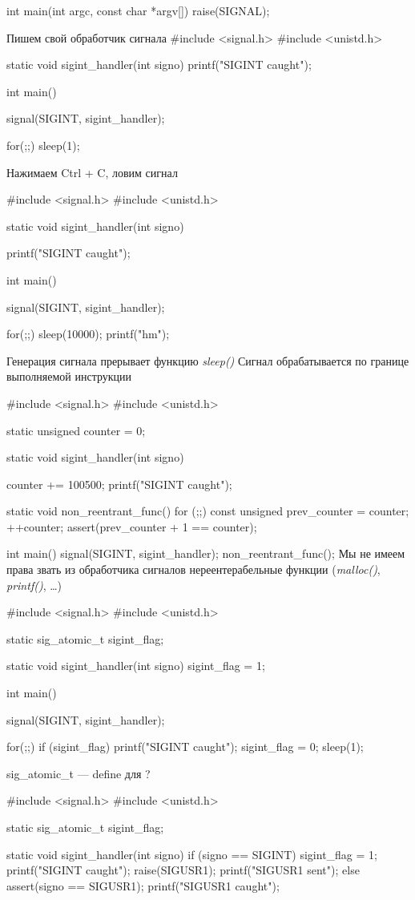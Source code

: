 int main(int argc, const char *argv[]) {
    raise(SIGNAL);
}

Пишем свой обработчик сигнала
#include <signal.h>
#include <unistd.h>

static void sigint_handler(int signo) {
    printf("SIGINT caught\n");
}

int main() {
    signal(SIGINT, sigint_handler);

    for(;;) {
        sleep(1);
    }
}
Нажимаем Ctrl + C, ловим сигнал

#include <signal.h>
#include <unistd.h>

static void sigint_handler(int signo) {
    printf("SIGINT caught\n");

}

int main() {
    signal(SIGINT, sigint_handler);

    for(;;) {
        sleep(10000);
        printf("hm\n");
    }
}
Генерация сигнала прерывает функцию \emph{sleep()}
Сигнал обрабатывается по границе выполняемой инструкции

#include <signal.h>
#include <unistd.h>

static unsigned counter = 0;

static void sigint_handler(int signo) {
    counter += 100500;
    printf("SIGINT caught\n");

}

static void non_reentrant_func() {
    for (;;) {
        const unsigned prev_counter = counter;
        ++counter;
        assert(prev_counter + 1 == counter);
    }
}

int main() {
    signal(SIGINT, sigint_handler);
    non_reentrant_func();
}
Мы не имеем права звать из обработчика сигналов нереентерабельные функции (\emph{malloc()}, \emph{printf()}, \dots)

#include <signal.h>
#include <unistd.h>

static sig_atomic_t sigint_flag;

static void sigint_handler(int signo) {
    sigint_flag = 1;
}

int main() {
    signal(SIGINT, sigint_handler);

    for(;;) {
        if (sigint_flag) {
            printf("SIGINT caught\n");
            sigint_flag = 0;
        }
        sleep(1);
    }
}
sig_atomic_t --- define для ?


#include <signal.h>
#include <unistd.h>

static sig_atomic_t sigint_flag;

static void sigint_handler(int signo) {
    if (signo == SIGINT) {
        sigint_flag = 1;
        printf("SIGINT caught\n");
        raise(SIGUSR1);
        printf("SIGUSR1 sent\n");
    } else {
        assert(signo == SIGUSR1);
        printf("SIGUSR1 caught\n");
    }
}

